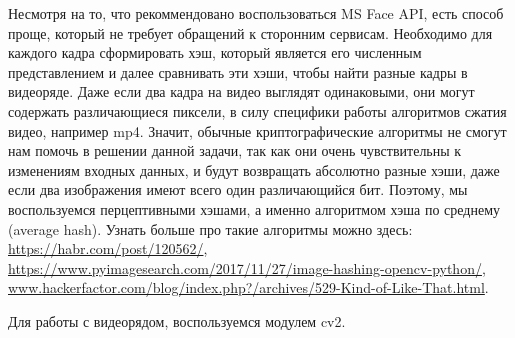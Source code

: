 \solutionSection

Несмотря на то, что рекоммендовано воспользоваться MS Face API, есть способ проще, который не требует обращений к сторонним сервисам.
Необходимо для каждого кадра сформировать хэш, который является его численным представлением и далее сравнивать эти хэши, чтобы найти разные кадры в видеоряде.
Даже если два кадра на видео выглядят одинаковыми, они могут содержать различающиеся пиксели, в силу специфики работы алгоритмов сжатия видео, например mp4. Значит, обычные криптографические алгоритмы не смогут нам помочь в решении данной задачи, так как они очень чувствительны к изменениям входных данных, и будут возвращать абсолютно разные хэши, даже если два изображения имеют всего один различающийся бит.
Поэтому, мы воспользуемся перцептивными хэшами, а именно алгоритмом хэша по среднему (average hash). Узнать больше про такие алгоритмы можно здесь: \url{https://habr.com/post/120562/}, \url{https://www.pyimagesearch.com/2017/11/27/image-hashing-opencv-python/}, \url{www.hackerfactor.com/blog/index.php?/archi}\linebreak \url{ves/529-Kind-of-Like-That.html}.

Для работы с видеорядом, воспользуемся модулем cv2.

\codeExample

